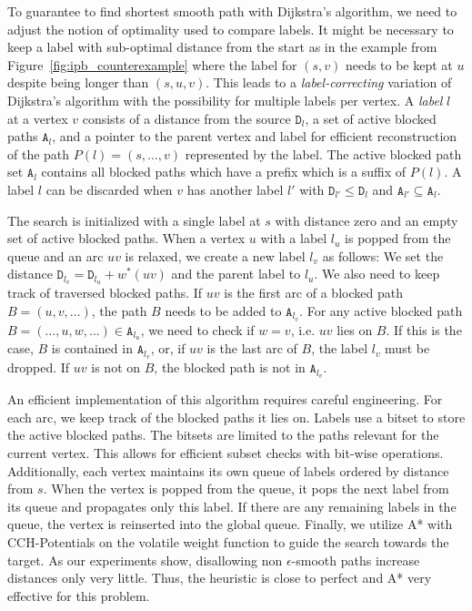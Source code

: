 \documentclass[a4paper,UKenglish,cleveref, autoref, thm-restate]{lipics-v2021}
\begin{document}
To guarantee to find shortest smooth path with Dijkstra's algorithm, we need to adjust the notion of optimality used to compare labels.
It might be necessary to keep a label with sub-optimal distance from the start as in the example from Figure~\ref{fig:ipb_counterexample} where the label for $(s,v)$ needs to be kept at $u$ despite being longer than $(s,u,v)$.
This leads to a \emph{label-correcting} variation of Dijkstra's algorithm with the possibility for multiple labels per vertex.
A \emph{label} $l$ at a vertex $v$ consists of a distance from the source $\mathtt{D}_l$, a set of active blocked paths $\mathtt{A}_l$, and a pointer to the parent vertex and label for efficient reconstruction of the path $P(l) = (s,\dots,v)$ represented by the label.
The active blocked path set $\mathtt{A}_l$ contains all blocked paths which have a prefix which is a suffix of $P(l)$.
A label $l$ can be discarded when $v$ has another label $l'$ with $\mathtt{D}_{l'} \leq \mathtt{D}_l$ and $\mathtt{A}_{l'} \subseteq \mathtt{A}_l$.

The search is initialized with a single label at $s$ with distance zero and an empty set of active blocked paths.
When a vertex $u$ with a label $l_u$ is popped from the queue and an arc $uv$ is relaxed, we create a new label $l_v$ as follows:
We set the distance $\mathtt{D}_{l_v} = \mathtt{D}_{l_u} + w^*(uv)$ and the parent label to $l_u$.
We also need to keep track of traversed blocked paths.
If $uv$ is the first arc of a blocked path $B = (u,v,\dots)$, the path $B$ needs to be added to $\mathtt{A}_{l_v}$.
For any active blocked path $B = (\dots, u, w, \dots) \in \mathtt{A}_{l_u}$, we need to check if $w=v$, i.e. $uv$ lies on $B$.
If this is the case, $B$ is contained in $\mathtt{A}_{l_v}$, or, if $uv$ is the last arc of $B$, the label $l_v$ must be dropped.
If $uv$ is not on $B$, the blocked path is not in $\mathtt{A}_{l_v}$.

An efficient implementation of this algorithm requires careful engineering.
For each arc, we keep track of the blocked paths it lies on.
Labels use a bitset to store the active blocked paths.
The bitsets are limited to the paths relevant for the current vertex.
This allows for efficient subset checks with bit-wise operations.
Additionally, each vertex maintains its own queue of labels ordered by distance from $s$.
When the vertex is popped from the queue, it pops the next label from its queue and propagates only this label.
If there are any remaining labels in the queue, the vertex is reinserted into the global queue.
Finally, we utilize A* with CCH-Potentials on the volatile weight function to guide the search towards the target.
As our experiments show, disallowing non $\epsilon$-smooth paths increase distances only very little.
Thus, the heuristic is close to perfect and A* very effective for this problem.
\end{document}

